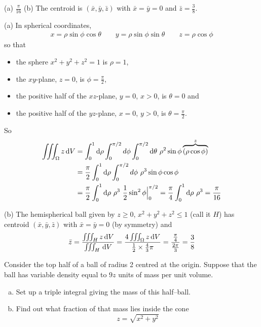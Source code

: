 
\begin{answer}
(a) $\frac{\pi}{16}$\qquad
(b)  The centroid is $(\bar x,\bar y,\bar z)$ with 
$\bar x=\bar y=0$ and $\bar z=\frac{3}{8}$.
\end{answer}

\begin{solution}
(a) 
In spherical coordinates,
\begin{align*}
x=\rho\sin\phi\cos\theta\qquad y=\rho\sin\phi\sin\theta\qquad z=\rho\cos\phi
\end{align*}
so that
\begin{itemize}
\item
the sphere $x^2+y^2+z^2=1$ is $\rho=1$, 
\item
the $xy$-plane, $z=0$, is $\phi=\frac{\pi}{2}$, 
\item
the positive half of the $xz$-plane, $y=0$, $x>0$, is $\theta=0$ and 
\item
the positive half of the $yz$-plane, $x=0$, $y>0$, is $\theta=\frac{\pi}{2}$. 
\end{itemize}
So
\begin{align*}
\iiint_\Omega z\,\mathrm{d}V&=
\int_0^1 \mathrm{d}\rho\int_0^{\pi/2}d\phi\int _0^{\pi/2}\mathrm{d}\theta\  \rho^2\sin\phi\overbrace{(\rho\cos\phi)}^{z} \\
&=\frac{\pi}{2}\int_0^1 \mathrm{d}\rho\int_0^{\pi/2}d\phi\  \rho^3\sin\phi \cos\phi
\\
&=\frac{\pi}{2}\int_0^1 \mathrm{d}\rho\  \rho^3\ \frac{1}{2}\sin^2\phi \Big|_0^{\pi/2}
=\frac{\pi}{4}\int_0^1 \mathrm{d}\rho\  \rho^3
=\frac{\pi}{16}
\end{align*}

(b) The hemispherical ball given by $z\ge 0$, $x^2+y^2+z^2\le 1$
(call it $H$) has centroid $(\bar x,\bar y,\bar z)$ with 
$\bar x=\bar y=0$ (by symmetry) and
\begin{align*}
\bar z=\frac{\iiint_H z\,\mathrm{d}V}{\iiint_H\,\mathrm{d}V}
=\frac{4\iiint_\Omega z\,\mathrm{d}V}{\tfrac{1}{2}\times\frac{4}{3}\pi}
=\frac{\frac{\pi}{4}}{\frac{2\pi}{3}}
=\frac{3}{8}
\end{align*}
\end{solution}

\begin{question}[M200 2000D] %
Consider the top half of a ball of radius 2 centred at the
origin. Suppose that the ball has variable density equal to $9z$ units
of mass per unit volume.
\begin{enumerate}[(a)]
\item 
Set up a triple integral giving the mass of this half--ball.

\item
Find out what fraction of that mass lies inside the cone
\begin{equation*}
z=\sqrt{x^2+y^2}
\end{equation*}
\end{enumerate}
\end{question}

